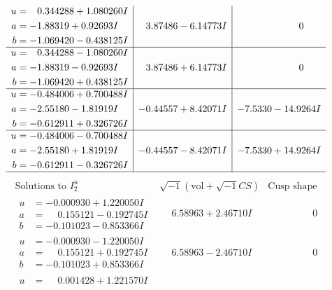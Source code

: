 \documentclass[1p]{elsarticle_modified}
\theoremstyle{definition}
\newcommand{\I}{\sqrt{-1}}
\begin{document}
$$\begin{array}{c|c|c}
\begin{aligned}
u &= \phantom{-}0.344288 + 1.080260 I \\
a &= -1.88319 + 0.92693 I \\
b &= -1.069420 - 0.438125 I\end{aligned}
 & \phantom{-}3.87486 - 6.14773 I & \phantom{-0.000000 } 0 \\ \hline\begin{aligned}
u &= \phantom{-}0.344288 - 1.080260 I \\
a &= -1.88319 - 0.92693 I \\
b &= -1.069420 + 0.438125 I\end{aligned}
 & \phantom{-}3.87486 + 6.14773 I & \phantom{-0.000000 } 0 \\ \hline\begin{aligned}
u &= -0.484006 + 0.700488 I \\
a &= -2.55180 - 1.81919 I \\
b &= -0.612911 + 0.326726 I\end{aligned}
 & -0.44557 + 8.42071 I & -7.5330 - 14.9264 I \\ \hline\begin{aligned}
u &= -0.484006 - 0.700488 I \\
a &= -2.55180 + 1.81919 I \\
b &= -0.612911 - 0.326726 I\end{aligned}
 & -0.44557 - 8.42071 I & -7.5330 + 14.9264 I\\
 \hline 
 \end{array}$$\newpage$$\begin{array}{c|c|c}  
\text{Solutions to }I^u_{2}& \I (\text{vol} + \sqrt{-1}CS) & \text{Cusp shape}\\
 \hline 
\begin{aligned}
u &= -0.000930 + 1.220050 I \\
a &= \phantom{-}0.155121 - 0.192745 I \\
b &= -0.101023 - 0.853366 I\end{aligned}
 & \phantom{-}6.58963 + 2.46710 I & \phantom{-0.000000 } 0 \\ \hline\begin{aligned}
u &= -0.000930 - 1.220050 I \\
a &= \phantom{-}0.155121 + 0.192745 I \\
b &= -0.101023 + 0.853366 I\end{aligned}
 & \phantom{-}6.58963 - 2.46710 I & \phantom{-0.000000 } 0 \\ \hline\begin{aligned}
u &= \phantom{-}0.001428 + 1.221570 I \\

\end{aligned}
\end{array}$$
\end{document}
